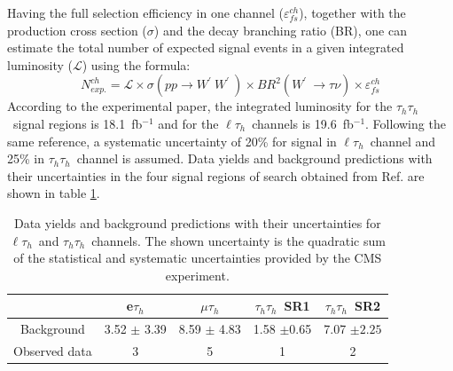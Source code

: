 \documentclass[preprint,showpacs,preprintnumbers]{revtex4}
\newcommand{\wprime}{\ensuremath{W^\prime}~}
\newcommand{\Tau}{\ensuremath{\tau_h}}
\newcommand{\tauTau}{\ensuremath{\tau_h\tau_h}}
\newcommand{\lepTau}{\ensuremath{\ell\tau_h}}
\begin{document}
Having the full selection efficiency in one channel ($\varepsilon^{ch}_{fs}$), together with the production cross section ($\sigma$) and the decay branching ratio (BR), one can estimate the total number of expected signal events in a given integrated luminosity ($\mathcal{L}$) using the formula:
\begin{equation}
N^{ch}_{exp.}= \mathcal{L} \times \sigma(pp \to \wprime\wprime) \times BR^{2}(\wprime \to \tau \nu) \times \varepsilon^{ch}_{fs}
\end{equation}
According to the experimental paper, the integrated luminosity for the \tauTau ~signal regions is 18.1~fb$^{-1}$ and for the \lepTau ~channels is 19.6~fb$^{-1}$. Following the same reference, a systematic uncertainty of 20\% for signal in \lepTau ~channel and 25\% in \tauTau ~channel is assumed. Data yields and background predictions with their uncertainties in the four signal regions of search obtained from Ref.\cite{Khachatryan:2016trj} are shown in table \ref{tab:yields}. 
\begin{table}[htb]
	\centering
	\caption{Data yields and background predictions with their uncertainties for \lepTau ~and \tauTau ~channels. The shown uncertainty is the quadratic sum of the statistical and systematic uncertainties provided by the CMS experiment.\label{tab:yields} }
	\begin{tabular}{|c|c|c|c|c|}
		\hline 
		&    e\Tau       &  $\mu\Tau$     &  \tauTau ~SR1  & \tauTau ~SR2 \\
		\hline 
		Background &3.52 $\pm$ 3.39 &8.59 $\pm$ 4.83 &1.58 $\pm$0.65 &7.07 $\pm2.25$ \\     
		Observed data& 3            &      5         &    1          &    2    \\  
		\hline
	\end{tabular}
\end{table}
\end{document}
